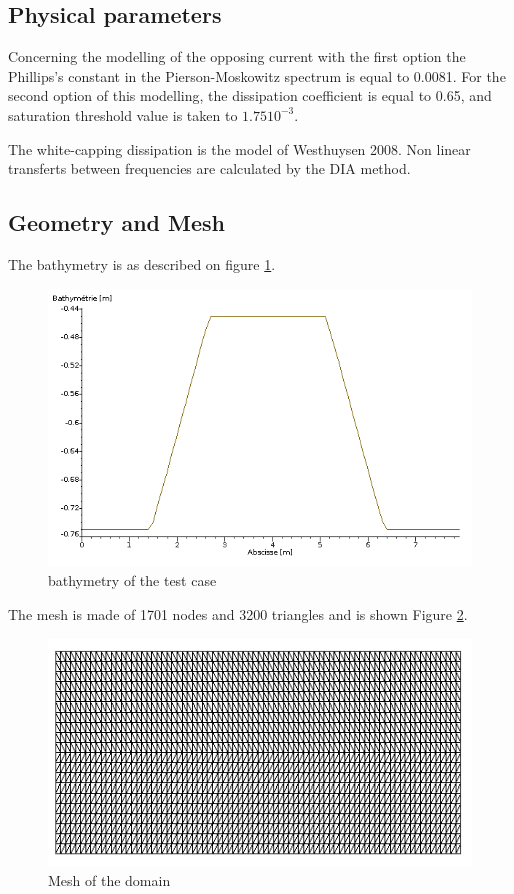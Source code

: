 \subsection{Physical parameters}
 Concerning the modelling of the opposing current with the first option the Phillips’s constant in the Pierson-Moskowitz spectrum is equal to 0.0081.
For the second option of this modelling, the dissipation coefficient is equal to 0.65, and saturation threshold value is taken to $1.75 10^{-3}$.

The white-capping dissipation is the model of Westhuysen 2008. Non linear transferts between frequencies are calculated by the DIA method.

%
%
%
\subsection{Geometry and Mesh}
%
The bathymetry is as described on figure \ref{bathyop}.
\begin{figure} [!h]
\centering
\includegraphics[scale = 0.5]{bathymetrie.png}
 \caption{bathymetry of the test case }
\label{bathyop}
\end{figure}

The mesh is made of 1701 nodes and 3200 triangles  and is shown Figure \ref{mailop}.
\begin{figure} [!h]
\centering
\includegraphics[scale = 0.65]{maillage.png}
 \caption{Mesh of the domain}
\label{mailop}
\end{figure}



